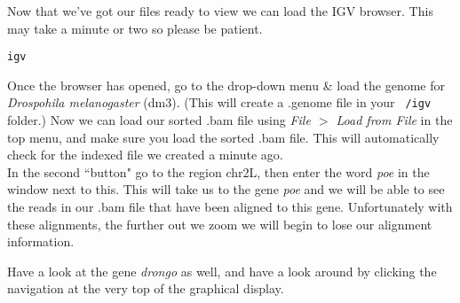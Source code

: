 Now that we've got our files ready to view we can load the IGV browser.
This may take a minute or two so please be patient.

\begin{lstlisting}
igv
\end{lstlisting}

Once the browser has opened, go to the drop-down menu \& load the genome for \textit{Drospohila melanogaster} (dm3).
(This will create a .genome file in your \texttt{~/igv} folder.)
Now we can load our sorted .bam file using  \textit{File $>$ Load from File} in the top menu, and make sure you load the sorted .bam file.
This will automatically check for the indexed file we created a minute ago. \\

In the second ``button" go to the region chr2L, then enter the word \textit{poe} in the window next to this.
This will take us to the gene \textit{poe} and we will be able to see the reads in our .bam file that have been aligned to this gene.
Unfortunately with these alignments, the further out we zoom we will begin to lose our alignment information.

Have a look at the gene \textit{drongo} as well, and have a look around by clicking the navigation at the very top of the graphical display.




